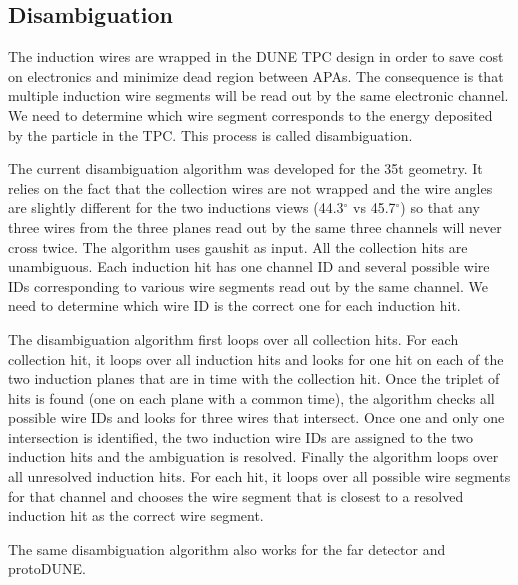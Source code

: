 \subsection{Disambiguation}
The induction wires are wrapped in the DUNE TPC design in order to save cost on electronics and minimize dead region between APAs. The consequence is that multiple induction wire segments will be read out by the same electronic channel. We need to determine which wire segment corresponds to the energy deposited by the particle in the TPC. This process is called disambiguation. 

The current disambiguation algorithm was developed for the 35t geometry. It relies on the fact that the collection wires are not wrapped and the wire angles are slightly different for the two inductions views (44.3$^{\circ}$ vs 45.7$^{\circ}$) so that any three wires from the three planes read out by the same three channels will never cross twice. The algorithm uses gaushit as input. All the collection hits are unambiguous. Each induction hit has one channel ID and several possible wire IDs corresponding to various wire segments read out by the same channel. We need to determine which wire ID is the correct one for each induction hit. 

The disambiguation algorithm first loops over all collection hits. For each collection hit, it loops over all induction hits and looks for one hit on each of the two induction planes that are in time with the collection hit. Once the triplet of hits is found (one on each plane with a common time), the algorithm checks all possible wire IDs and looks for three wires that intersect. Once one and only one intersection is identified, the two induction wire IDs are assigned to the two induction hits and the ambiguation is resolved. Finally the algorithm loops over all unresolved induction hits. For each hit, it loops over all possible wire segments for that channel and chooses the wire segment that is closest to a resolved induction hit as the correct wire segment. 

The same disambiguation algorithm also works for the far detector and protoDUNE.

